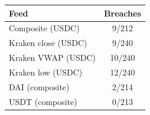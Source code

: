\begin{tabular}{@{}lc@{}}
\toprule
Feed & Breaches \\
\midrule
Composite (USDC) & 9/212 \\
Kraken close (USDC) & 9/240 \\
Kraken VWAP (USDC) & 10/240 \\
Kraken low (USDC) & 12/240 \\
DAI (composite) & 2/214 \\
USDT (composite) & 0/213 \\
\bottomrule
\end{tabular}
